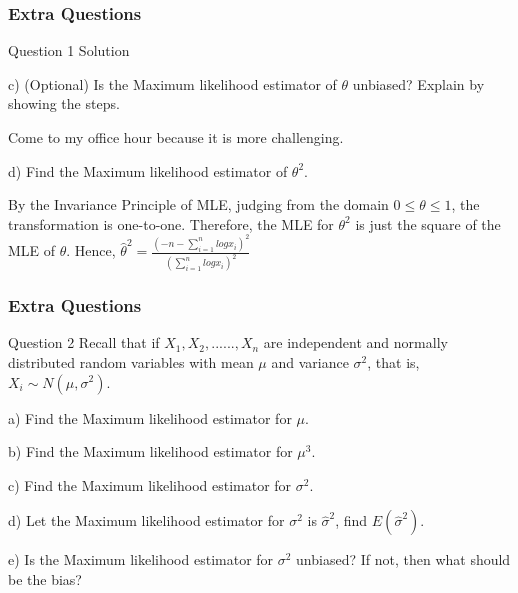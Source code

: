\documentclass{beamer}
\begin{document}

\begin{frame}
\frametitle{Extra Questions}
\begin{block}{Question 1 Solution}

c) (Optional) Is the Maximum likelihood estimator of $\theta$ unbiased? Explain by showing the steps.

Come to my office hour because it is more challenging.

\vspace{3mm}

d) Find the Maximum likelihood estimator of $\theta^2$.

By the Invariance Principle of MLE, judging from the domain $0 \le \theta \le 1$, the transformation is one-to-one. Therefore, the MLE for $\theta^2$ is just the square of the MLE of $\theta$. Hence, $\hat \theta^2 = \frac{(-n - \sum_{i=1}^n log x_i)^2}{(\sum_{i=1}^n log x_i)^2}$

\end{block}

\end{frame}


\begin{frame}
\frametitle{Extra Questions}
\begin{block}{Question 2}
Recall that if $X_1,X_2,......,X_n$ are independent and normally distributed random variables with mean $\mu$ and variance $\sigma^2$, that is, $X_i \sim N(\mu,\sigma^2)$. 

\vspace{3mm}

a) Find the Maximum likelihood estimator for $\mu$.

b) Find the Maximum likelihood estimator for $\mu^3$.

c) Find the Maximum likelihood estimator for $\sigma^2$.

d) Let the Maximum likelihood estimator for $\sigma^2$ is $\hat \sigma^2$, find $E(\hat \sigma^2)$. 

e) Is the Maximum likelihood estimator for $\sigma^2$ unbiased? If not, then what should be the bias?

\end{block}


\end{frame}
\end{document}
